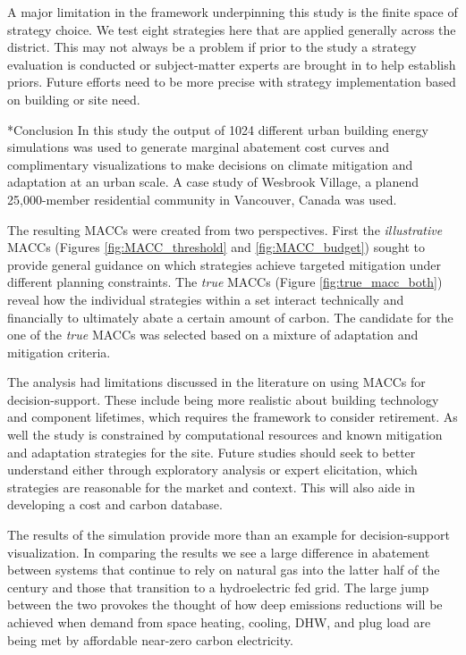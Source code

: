 \documentclass[twocolumn, a4paper,10pt]{article}
\makeatletter
\renewcommand\section{\@startsection{section}{1}{\z@}{3pt}{3pt}{\normalfont\large\bfseries}}
\makeatother
\begin{document}
A major limitation in the framework underpinning this study is the finite space of strategy choice. We test eight strategies here that are applied generally across the district. This may not always be a problem if prior to the study a strategy evaluation is conducted or subject-matter experts are brought in to help establish priors. Future efforts need to be more precise with strategy implementation based on building or site need. 

\section*{Conclusion}
In this study the output of 1024 different urban building energy simulations was used to generate marginal abatement cost curves and complimentary visualizations to make decisions on climate mitigation and adaptation at an urban scale. A case study of Wesbrook Village, a planend 25,000-member residential community in Vancouver, Canada was used.

The resulting MACCs were created from two perspectives. First the \textit{illustrative} MACCs (Figures \ref{fig:MACC_threshold} and \ref{fig:MACC_budget}) sought to provide general guidance on which strategies achieve targeted mitigation under different planning constraints. The \textit{true} MACCs (Figure \ref{fig:true_macc_both}) reveal how the individual strategies within a set interact technically and financially to ultimately abate a certain amount of carbon. The candidate for the one of the \textit{true} MACCs was selected based on a mixture of adaptation and mitigation criteria. 


The analysis had limitations discussed in the literature on using MACCs for decision-support. These include being more realistic about building technology and component lifetimes, which requires the framework to consider retirement. As well the study is constrained by computational resources and known mitigation and adaptation strategies for the site. Future studies should seek to better understand either through exploratory analysis or expert elicitation, which strategies are reasonable for the market and context. This will also aide in developing a cost and carbon database.

The results of the simulation provide more than an example for decision-support visualization. In comparing the results we see a large difference in abatement between systems that continue to rely on natural gas into the latter half of the century and those that transition to a hydroelectric fed grid. The large jump between the two provokes the thought of how deep emissions reductions will be achieved when demand from space heating, cooling, DHW, and plug load are being met by affordable near-zero carbon electricity.
\end{document}

